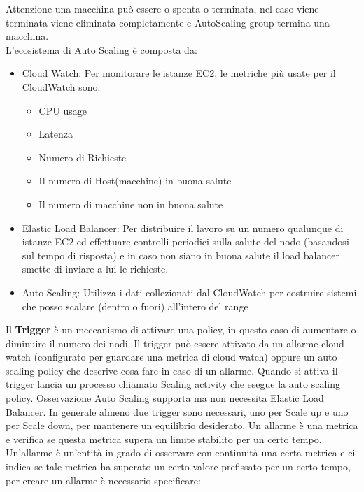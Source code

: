 \documentclass[11pt, twocolumn]{article}
\newenvironment{myitemize}
{ \begin{itemize}[topsep=0ex]
		\setlength{\itemsep}{0pt}
		\setlength{\parskip}{0pt}
		\setlength{\parsep}{0pt}     }
	{ \end{itemize}                  }
\begin{document}
Attenzione una macchina può essere o spenta o terminata, nel caso viene terminata viene eliminata completamente e AutoScaling group termina una macchina.\\
L'ecosistema di Auto Scaling è composta da:
\begin{myitemize}
	\item Cloud Watch: Per monitorare le istanze EC2, le metriche più usate per il CloudWatch sono:
	\begin{myitemize}
		\item CPU usage
		\item Latenza
		\item Numero di Richieste
		\item Il numero di Host(macchine) in buona salute
		\item Il numero di macchine non in buona salute
	\end{myitemize}
	\item Elastic Load Balancer: Per distribuire il lavoro su un numero qualunque di istanze EC2 ed effettuare controlli periodici sulla salute del nodo (basandosi sul tempo di risposta) e in caso non siano in buona salute il load balancer smette di inviare a lui le richieste.
	\item Auto Scaling: Utilizza i dati collezionati dal CloudWatch per costruire sistemi che posso scalare (dentro o fuori) all'intero del range
\end{myitemize}
Il \textbf{Trigger} è un meccanismo di attivare una policy, in questo caso di aumentare o diminuire il numero dei nodi. Il trigger può essere attivato da un allarme cloud watch (configurato per guardare una metrica di cloud watch) oppure un auto scaling policy che descrive cosa fare in caso di un allarme. Quando si attiva il trigger lancia un processo chiamato Scaling activity che esegue la auto scaling policy.
Osservazione Auto Scaling supporta ma non necessita Elastic Load Balancer.
In generale almeno due trigger sono necessari, uno per Scale up e uno per Scale down, per mantenere un equilibrio desiderato.
Un allarme è una metrica e verifica se questa metrica supera un limite stabilito per un certo tempo.\\
Un'allarme è un'entità in grado di osservare con continuità una certa metrica e ci indica se tale metrica ha superato un certo valore prefissato per un certo tempo, per creare un allarme è necessario specificare:
\end{document}
